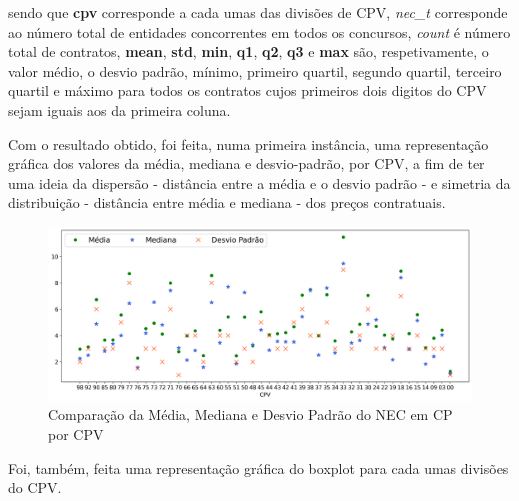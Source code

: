 sendo que \textbf{cpv} corresponde a cada umas das divisões de CPV, \textit{nec\_t} corresponde ao número total de entidades concorrentes em todos os concursos, \textit{count} é número total de contratos, \textbf{mean}, \textbf{std}, \textbf{min}, \textbf{q1}, \textbf{q2}, \textbf{q3} e \textbf{max} são, respetivamente, o valor médio, o desvio padrão, mínimo, primeiro quartil, segundo quartil, terceiro quartil e máximo para todos os contratos cujos primeiros dois digitos do CPV sejam iguais aos da primeira coluna. 

Com o resultado obtido, foi feita, numa primeira instância, uma representação gráfica dos valores da média, mediana e desvio-padrão, por CPV, a fim de ter uma ideia da dispersão - distância entre a média e o desvio padrão - e simetria da distribuição - distância entre média e mediana - dos preços contratuais.

\begin{figure}[!htbp]
	\centering
	\includegraphics[width=\textwidth]{imagens/mmdp.png}
	\caption{Comparação da Média, Mediana e Desvio Padrão do NEC em CP por CPV}
	\label{}
\end{figure}

Foi, também, feita uma representação gráfica do boxplot para cada umas divisões do CPV. 

%
%


